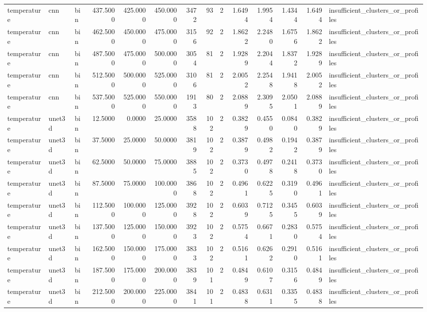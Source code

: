 \begin{tabular}{lllrrrrrrrrrrl}
temperature & cnn & bin & 437.5000 & 425.0000 & 450.0000 & 3472 & 93 & 2 & 1.6494 & 1.9954 & 1.4344 & 1.6494 & insufficient_clusters_or_profiles \\
temperature & cnn & bin & 462.5000 & 450.0000 & 475.0000 & 3156 & 92 & 2 & 1.8622 & 2.2480 & 1.6756 & 1.8622 & insufficient_clusters_or_profiles \\
temperature & cnn & bin & 487.5000 & 475.0000 & 500.0000 & 3054 & 81 & 2 & 1.9289 & 2.2044 & 1.8372 & 1.9289 & insufficient_clusters_or_profiles \\
temperature & cnn & bin & 512.5000 & 500.0000 & 525.0000 & 3106 & 81 & 2 & 2.0052 & 2.2548 & 1.9418 & 2.0052 & insufficient_clusters_or_profiles \\
temperature & cnn & bin & 537.5000 & 525.0000 & 550.0000 & 1913 & 80 & 2 & 2.0889 & 2.3095 & 2.0501 & 2.0889 & insufficient_clusters_or_profiles \\
temperature & unet3d & bin & 12.5000 & 0.0000 & 25.0000 & 3588 & 102 & 2 & 0.3829 & 0.4550 & 0.0840 & 0.3829 & insufficient_clusters_or_profiles \\
temperature & unet3d & bin & 37.5000 & 25.0000 & 50.0000 & 3819 & 102 & 2 & 0.3879 & 0.4982 & 0.1942 & 0.3879 & insufficient_clusters_or_profiles \\
temperature & unet3d & bin & 62.5000 & 50.0000 & 75.0000 & 3885 & 102 & 2 & 0.3730 & 0.4978 & 0.2418 & 0.3730 & insufficient_clusters_or_profiles \\
temperature & unet3d & bin & 87.5000 & 75.0000 & 100.0000 & 3868 & 102 & 2 & 0.4961 & 0.6225 & 0.3190 & 0.4961 & insufficient_clusters_or_profiles \\
temperature & unet3d & bin & 112.5000 & 100.0000 & 125.0000 & 3928 & 102 & 2 & 0.6039 & 0.7125 & 0.3455 & 0.6039 & insufficient_clusters_or_profiles \\
temperature & unet3d & bin & 137.5000 & 125.0000 & 150.0000 & 3923 & 102 & 2 & 0.5754 & 0.6671 & 0.2830 & 0.5754 & insufficient_clusters_or_profiles \\
temperature & unet3d & bin & 162.5000 & 150.0000 & 175.0000 & 3833 & 102 & 2 & 0.5161 & 0.6262 & 0.2910 & 0.5161 & insufficient_clusters_or_profiles \\
temperature & unet3d & bin & 187.5000 & 175.0000 & 200.0000 & 3839 & 101 & 2 & 0.4849 & 0.6107 & 0.3156 & 0.4849 & insufficient_clusters_or_profiles \\
temperature & unet3d & bin & 212.5000 & 200.0000 & 225.0000 & 3841 & 101 & 2 & 0.4838 & 0.6311 & 0.3355 & 0.4838 & insufficient_clusters_or_profiles \\

\end{tabular}

